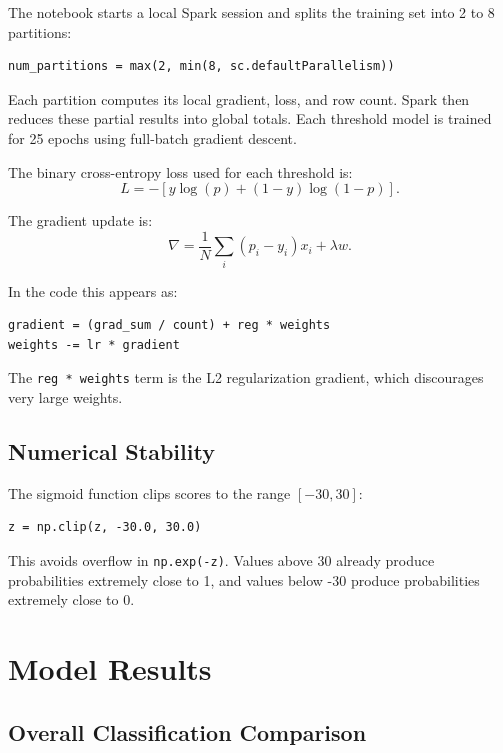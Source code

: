 \documentclass[11pt,a4paper]{article}
\begin{document}
The notebook starts a local Spark session and splits the training set into 2 to 8 partitions:
\begin{verbatim}
num_partitions = max(2, min(8, sc.defaultParallelism))
\end{verbatim}

Each partition computes its local gradient, loss, and row count. Spark then reduces these partial results into global totals. Each threshold model is trained for 25 epochs using full-batch gradient descent.

The binary cross-entropy loss used for each threshold is:
\[
L = - \left[y \log(p) + (1-y)\log(1-p)\right].
\]

The gradient update is:
\[
\nabla = \frac{1}{N}\sum_i (p_i - y_i)x_i + \lambda w.
\]

In the code this appears as:
\begin{verbatim}
gradient = (grad_sum / count) + reg * weights
weights -= lr * gradient
\end{verbatim}

The \texttt{reg * weights} term is the L2 regularization gradient, which discourages very large weights.

\subsection{Numerical Stability}

The sigmoid function clips scores to the range $[-30, 30]$:
\begin{verbatim}
z = np.clip(z, -30.0, 30.0)
\end{verbatim}

This avoids overflow in \texttt{np.exp(-z)}. Values above 30 already produce probabilities extremely close to 1, and values below -30 produce probabilities extremely close to 0.

\section{Model Results}

\subsection{Overall Classification Comparison}
\end{document}
